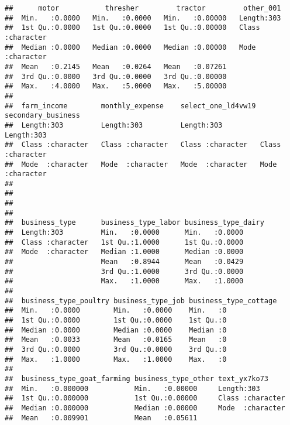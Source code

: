 \documentclass[
]{article}
\begin{document}
\begin{verbatim}
##      motor           thresher         tractor         other_001        
##  Min.   :0.0000   Min.   :0.0000   Min.   :0.00000   Length:303        
##  1st Qu.:0.0000   1st Qu.:0.0000   1st Qu.:0.00000   Class :character  
##  Median :0.0000   Median :0.0000   Median :0.00000   Mode  :character  
##  Mean   :0.2145   Mean   :0.0264   Mean   :0.07261                     
##  3rd Qu.:0.0000   3rd Qu.:0.0000   3rd Qu.:0.00000                     
##  Max.   :4.0000   Max.   :5.0000   Max.   :5.00000                     
##                                                                        
##  farm_income        monthly_expense    select_one_ld4vw19 secondary_business
##  Length:303         Length:303         Length:303         Length:303        
##  Class :character   Class :character   Class :character   Class :character  
##  Mode  :character   Mode  :character   Mode  :character   Mode  :character  
##                                                                             
##                                                                             
##                                                                             
##                                                                             
##  business_type      business_type_labor business_type_dairy
##  Length:303         Min.   :0.0000      Min.   :0.0000     
##  Class :character   1st Qu.:1.0000      1st Qu.:0.0000     
##  Mode  :character   Median :1.0000      Median :0.0000     
##                     Mean   :0.8944      Mean   :0.0429     
##                     3rd Qu.:1.0000      3rd Qu.:0.0000     
##                     Max.   :1.0000      Max.   :1.0000     
##                                                            
##  business_type_poultry business_type_job business_type_cottage
##  Min.   :0.0000        Min.   :0.0000    Min.   :0            
##  1st Qu.:0.0000        1st Qu.:0.0000    1st Qu.:0            
##  Median :0.0000        Median :0.0000    Median :0            
##  Mean   :0.0033        Mean   :0.0165    Mean   :0            
##  3rd Qu.:0.0000        3rd Qu.:0.0000    3rd Qu.:0            
##  Max.   :1.0000        Max.   :1.0000    Max.   :0            
##                                                               
##  business_type_goat_farming business_type_other text_yx7ko73      
##  Min.   :0.000000           Min.   :0.00000     Length:303        
##  1st Qu.:0.000000           1st Qu.:0.00000     Class :character  
##  Median :0.000000           Median :0.00000     Mode  :character  
##  Mean   :0.009901           Mean   :0.05611                       

\end{verbatim}
\end{document}
